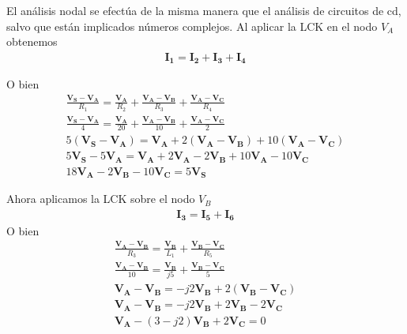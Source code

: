 \documentclass{article}
\begin{document}

	El análisis nodal se efectúa de la misma manera que el análisis de circuitos de cd, salvo que están implicados números complejos.
	Al aplicar la LCK en el nodo $V_A$ obtenemos
	\begin{align}
		\bm{I_1} = \bm{I_2} + \bm{I_3} + \bm{I_4}\nonumber
	\end{align}
	
	\noindent O bien
	\begin{align}
		\frac{\bm{V_S} - \bm{V_A}}{R_1} = \frac{\bm{V_A}}{R_2} + \frac{\bm{V_A} - \bm{V_B}}{R_3} + \frac{\bm{V_A} - \bm{V_C}}{R_4}\nonumber\\
		\frac{\bm{V_S} - \bm{V_A}}{4} = \frac{\bm{V_A}}{20} + \frac{\bm{V_A} - \bm{V_B}}{10} + \frac{\bm{V_A} - \bm{V_C}}{2}\nonumber\\
		5(\bm{V_S} - \bm{V_A}) = \bm{V_A} + 2(\bm{V_A} - \bm{V_B}) + 10(\bm{V_A} - \bm{V_C})\nonumber\\
		5\bm{V_S} - 5\bm{V_A} = \bm{V_A} + 2\bm{V_A} - 2\bm{V_B} + 10\bm{V_A} - 10\bm{V_C}\nonumber\\
		18\bm{V_A} - 2\bm{V_B} - 10\bm{V_C} = 5\bm{V_S}
	\end{align}

	\noindent Ahora aplicamos la LCK sobre el nodo $V_B$
	\begin{align}
		\bm{I_3} = \bm{I_5} + \bm{I_6}\nonumber 
	\end{align}
	\noindent O bien
	\begin{align}
		\frac{\bm{V_A} - \bm{V_B}}{R_3} = \frac{\bm{V_B}}{L_1} + \frac{\bm{V_B} - \bm{V_C}}{R_5}\nonumber\\
		\frac{\bm{V_A} - \bm{V_B}}{10} = \frac{\bm{V_B}}{j5} + \frac{\bm{V_B} - \bm{V_C}}{5}\nonumber\\
		\bm{V_A} - \bm{V_B} = -j2\bm{V_B} + 2(\bm{V_B} - \bm{V_C})\nonumber\\
		\bm{V_A} - \bm{V_B} = -j2\bm{V_B} + 2\bm{V_B} - 2\bm{V_C}\nonumber\\
		\bm{V_A} - (3 - j2)\bm{V_B} + 2\bm{V_C} = 0
	\end{align}
\end{document}
